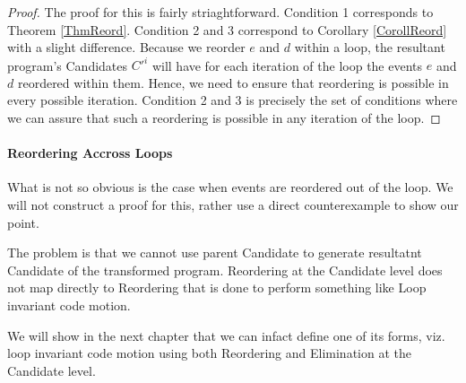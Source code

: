         \begin{proof}
        
            The proof for this is fairly striaghtforward. 
            Condition 1 corresponds to Theorem \ref{ThmReord}. 
            Condition 2 and 3 correspond to Corollary \ref{CorollReord} with a slight difference. Because we reorder $e$ and $d$ within a loop, the resultant program's Candidates $C'^i$ will have for each iteration of the loop the events $e$ and $d$ reordered within them. 
            Hence, we need to ensure that reordering is possible in every possible iteration. 
            Condition 2 and 3 is precisely the set of conditions where we can assure that such a reordering is possible in any iteration of the loop\footnotemark. 
            

        \end{proof}


        \paragraph{Reordering Accross Loops}
            What is not so obvious is the case when events are reordered out of the loop. We will not construct a proof for this, rather use a direct counterexample to show our point. 

            The problem is that we cannot use parent Candidate to generate resultatnt Candidate of the transformed program. Reordering at the Candidate level does not map directly to Reordering that is done to perform something like Loop invariant code motion. 

            We will show in the next chapter that we can infact define one of its forms, viz. loop invariant code motion using both Reordering and Elimination at the Candidate level.
             
    